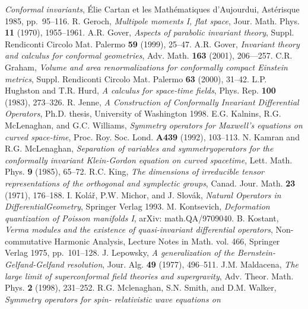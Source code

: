 \documentclass[a4paper,12pt]{amsart}
\begin{document}
\begin{thebibliography}{XX}
{\em Conformal invariants},
\'Elie Cartan et les Math\'ematiques d'Aujourdui,
Ast\'erisque 1985, pp.~95--116.
 R. Geroch,
{\em Multipole moments I, flat space},
Jour. Math. Phys. {\bf 11} (1970), 1955--1961.
 A.R. Gover,
{\em Aspects of parabolic invariant theory},
Suppl. Rendiconti Circolo Mat. Palermo {\bf 59} (1999), 25--47.
 A.R. Gover,
{\em Invariant theory and calculus for conformal geometries},
Adv. Math. {\bf 163} (2001), 206---257.
 C.R. Graham,
{\em Volume and area renormalizations for conformally compact Einstein
metrics},
Suppl. Rendiconti Circolo Mat. Palermo {\bf 63} (2000), 31--42.
 L.P. Hughston and T.R. Hurd,
{\em A \coordHE{} calculus for space-time fields},
Phys. Rep. {\bf 100} (1983), 273--326.
 R. Jenne,
{\em A Construction of Conformally Invariant Differential Operators},
Ph.D. thesis, University of Washington 1998.
 E.G. Kalnins, R.G. McLenaghan, and G.C. Williams,
{\em Symmetry operators for Maxwell's equations on curved space-time},
Proc. Roy. Soc. Lond. {\bf A439} (1992), 103--113.
 N. Kamran and R.G. McLenaghan,
{\em Separation of variables and symmetry\linebreak operators for the
conformally invariant Klein-Gordon equation on curved spacetime},
Lett. Math. Phys. {\bf 9} (1985), 65--72.
 R.C. King,
{\em The dimensions of irreducible tensor representations of the\linebreak
orthogonal and
symplectic groups},
Canad. Jour. Math. {\bf 23} (1971), 176--188.
 I. Kol\'a\v{r}, P.W. Michor, and J. Slov\'ak,
{\em Natural Operators in Differential\linebreak Geometry},
Springer Verlag 1993.
 M. Kontsevich,
{\em Deformation quantization of Poisson manifolds I},
arXiv: math.QA/9709040.
 B. Kostant,
{\em Verma modules and the existence of quasi-invariant differential
operators},
Non-commutative Harmonic Analysis,
Lecture Notes in Math. vol. 466, Springer Verlag 1975, pp.~101--128.
 J. Lepowsky,
{\em A generalization of the Bernstein-Gelfand-Gelfand resolution},
Jour. Alg. {\bf 49} (1977), 496--511.
 J.M. Maldacena,
{\em The large \coordHE{} limit of superconformal field theories and
\linebreak supergravity},
Adv. Theor. Math. Phys. {\bf 2} (1998), 231--252.
 R.G. Mclenaghan, S.N. Smith, and D.M. Walker,
{\em Symmetry operators for spin-\coordHE{} relativistic wave equations on
}
\end{thebibliography}
\end{document}
